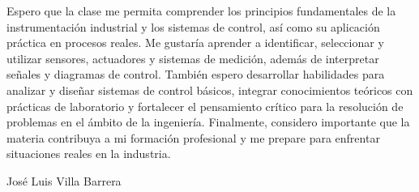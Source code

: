 
Espero que la clase me permita comprender los principios fundamentales de la instrumentación industrial y los sistemas de control, así como su aplicación práctica en procesos reales. Me gustaría aprender a identificar, seleccionar y utilizar sensores, actuadores y sistemas de medición, además de interpretar señales y diagramas de control.
También espero desarrollar habilidades para analizar y diseñar sistemas de control básicos, integrar conocimientos teóricos con prácticas de laboratorio y fortalecer el pensamiento crítico para la resolución de problemas en el ámbito de la ingeniería. Finalmente, considero importante que la materia contribuya a mi formación profesional y me prepare para enfrentar situaciones reales en la industria.

                   José Luis Villa Barrera